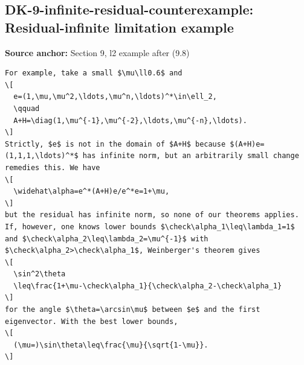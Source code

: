\subsection*{DK-9-infinite-residual-counterexample: Residual-infinite limitation example}
\noindent\textbf{Source anchor:} Section 9, l2 example after (9.8)\\
\begin{verbatim}
For example, take a small $\mu\ll0.6$ and
\[
  e=(1,\mu,\mu^2,\ldots,\mu^n,\ldots)^*\in\ell_2,
  \qquad
  A+H=\diag(1,\mu^{-1},\mu^{-2},\ldots,\mu^{-n},\ldots).
\]
Strictly, $e$ is not in the domain of $A+H$ because $(A+H)e=(1,1,1,\ldots)^*$ has infinite norm, but an arbitrarily small change remedies this. We have
\[
  \widehat\alpha=e^*(A+H)e/e^*e=1+\mu,
\]
but the residual has infinite norm, so none of our theorems applies. If, however, one knows lower bounds $\check\alpha_1\leq\lambda_1=1$ and $\check\alpha_2\leq\lambda_2=\mu^{-1}$ with $\check\alpha_2>\check\alpha_1$, Weinberger's theorem gives
\[
  \sin^2\theta
  \leq\frac{1+\mu-\check\alpha_1}{\check\alpha_2-\check\alpha_1}
\]
for the angle $\theta=\arcsin\mu$ between $e$ and the first eigenvector. With the best lower bounds,
\[
  (\mu=)\sin\theta\leq\frac{\mu}{\sqrt{1-\mu}}.
\]
\end{verbatim}

